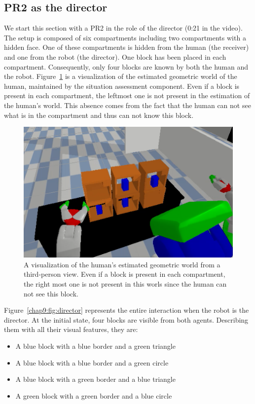 \documentclass[a4paper,11pt,twoside]{StyleThese}
\begin{document}
\subsection{PR2 as the director}

We start this section with a PR2 in the role of the director (0:21 in the video). The setup is composed of six compartments including two compartments with a hidden face. One of these compartments is hidden from the human (the receiver) and one from the robot (the director). One block has been placed in each compartment. Consequently, only four blocks are known by both the human and the robot. Figure~\ref{chap9:fig:robot_view} is a visualization of the estimated geometric world of the human, maintained by the situation assessment component. Even if a block is present in each compartment, the leftmost one is not present in the estimation of the human's world. This absence comes from the fact that the human can not see what is in the compartment and thus can not know this block.

\begin{figure}[ht!]
	\centering
	\includegraphics[scale=0.5]{figures/chapter4/robot_view.png}
	\caption{\label{chap9:fig:robot_view} A visualization of the human's estimated geometric world from a third-person view. Even if a block is present in each compartment, the right most one is not present in this worls since the human can not see this block. }
\end{figure}

Figure~\ref{chap9:fig:director} represents the entire interaction when the robot is the director. At the initial state, four blocks are visible from both agents. Describing them with all their visual features, they are:

\begin{itemize}
	\item A blue block with a blue border and a green triangle
	\item A blue block with a blue border and a green circle
	\item A blue block with a green border and a blue triangle
	\item A green block with a green border and a blue circle
\end{itemize}
\end{document}
